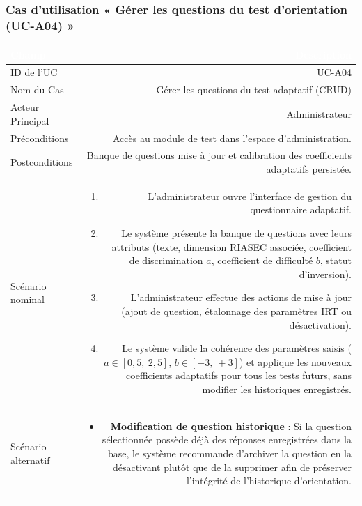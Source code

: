 \vspace{1em}

\subsubsection*{Cas d'utilisation « Gérer les questions du test d'orientation (UC-A04) »}

\noindent
\begin{tabular}{|L|R|}
\hline
{}\textcolor{white}{\textbf{Champ}} & \textcolor{white}{\textbf{Description}} \\
\hline
{}ID de l'UC & UC-A04 \\
\hline
Nom du Cas & Gérer les questions du test adaptatif (CRUD) \\
\hline
{}Acteur Principal & Administrateur \\
\hline
Préconditions & Accès au module de test dans l'espace d'administration. \\
\hline
{}Postconditions & Banque de questions mise à jour et calibration des coefficients adaptatifs persistée. \\
\hline
Scénario nominal &
\begin{enumerate}
  \item L'administrateur ouvre l'interface de gestion du questionnaire adaptatif.
  \item Le système présente la banque de questions avec leurs attributs (texte, dimension RIASEC associée, coefficient de discrimination $a$, coefficient de difficulté $b$, statut d'inversion).
  \item L'administrateur effectue des actions de mise à jour (ajout de question, étalonnage des paramètres IRT ou désactivation).
  \item Le système valide la cohérence des paramètres saisis ($a \in [0{,}5,\ 2{,}5]$, $b \in [-3,\ +3]$) et applique les nouveaux coefficients adaptatifs pour tous les tests futurs, sans modifier les historiques enregistrés.
\end{enumerate} \\
\hline
{}Scénario alternatif &
\begin{itemize}
  \item \textbf{Modification de question historique} : Si la question sélectionnée possède déjà des réponses enregistrées dans la base, le système recommande d'archiver la question en la désactivant plutôt que de la supprimer afin de préserver l'intégrité de l'historique d'orientation.
\end{itemize} \\
\hline
\end{tabular}

